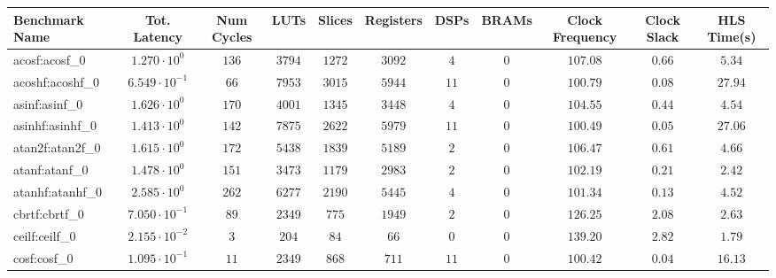 \begin{tabular}{|l|c|c|c|c|c|c|c|c|c|c|}
\hline
Benchmark Name               & Tot. Latency            & Num Cycles & LUTs       & Slices    & Registers & DSPs    & BRAMs & Clock Frequency & Clock Slack & HLS Time(s) \\
\hline
acosf:acosf\_0               & $ 1.270 \cdot 10^{0}  $ & $ 136    $ & $ 3794   $ & $ 1272  $ & $ 3092  $ & $ 4   $ & $ 0 $ & $ 107.08      $ & $ 0.66    $ & $ 5.34    $ \\
acoshf:acoshf\_0             & $ 6.549 \cdot 10^{-1} $ & $ 66     $ & $ 7953   $ & $ 3015  $ & $ 5944  $ & $ 11  $ & $ 0 $ & $ 100.79      $ & $ 0.08    $ & $ 27.94   $ \\
asinf:asinf\_0               & $ 1.626 \cdot 10^{0}  $ & $ 170    $ & $ 4001   $ & $ 1345  $ & $ 3448  $ & $ 4   $ & $ 0 $ & $ 104.55      $ & $ 0.44    $ & $ 4.54    $ \\
asinhf:asinhf\_0             & $ 1.413 \cdot 10^{0}  $ & $ 142    $ & $ 7875   $ & $ 2622  $ & $ 5979  $ & $ 11  $ & $ 0 $ & $ 100.49      $ & $ 0.05    $ & $ 27.06   $ \\
atan2f:atan2f\_0             & $ 1.615 \cdot 10^{0}  $ & $ 172    $ & $ 5438   $ & $ 1839  $ & $ 5189  $ & $ 2   $ & $ 0 $ & $ 106.47      $ & $ 0.61    $ & $ 4.66    $ \\
atanf:atanf\_0               & $ 1.478 \cdot 10^{0}  $ & $ 151    $ & $ 3473   $ & $ 1179  $ & $ 2983  $ & $ 2   $ & $ 0 $ & $ 102.19      $ & $ 0.21    $ & $ 2.42    $ \\
atanhf:atanhf\_0             & $ 2.585 \cdot 10^{0}  $ & $ 262    $ & $ 6277   $ & $ 2190  $ & $ 5445  $ & $ 4   $ & $ 0 $ & $ 101.34      $ & $ 0.13    $ & $ 4.52    $ \\
cbrtf:cbrtf\_0               & $ 7.050 \cdot 10^{-1} $ & $ 89     $ & $ 2349   $ & $ 775   $ & $ 1949  $ & $ 2   $ & $ 0 $ & $ 126.25      $ & $ 2.08    $ & $ 2.63    $ \\
ceilf:ceilf\_0               & $ 2.155 \cdot 10^{-2} $ & $ 3      $ & $ 204    $ & $ 84    $ & $ 66    $ & $ 0   $ & $ 0 $ & $ 139.20      $ & $ 2.82    $ & $ 1.79    $ \\
cosf:cosf\_0                 & $ 1.095 \cdot 10^{-1} $ & $ 11     $ & $ 2349   $ & $ 868   $ & $ 711   $ & $ 11  $ & $ 0 $ & $ 100.42      $ & $ 0.04    $ & $ 16.13   $ \\

\end{tabular}
